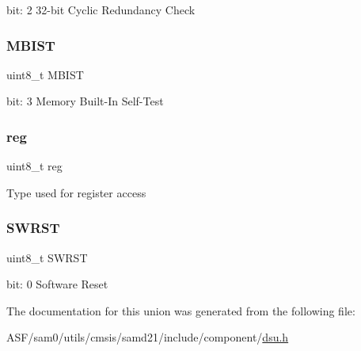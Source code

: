 bit\+: 2 32-\/bit Cyclic Redundancy Check \mbox{\label{union_d_s_u___c_t_r_l___type_aab65dd9b182f6be2254611db5d495217}} 
\subsubsection{\texorpdfstring{MBIST}{MBIST}}
{\footnotesize\ttfamily uint8\+\_\+t M\+B\+I\+ST}

bit\+: 3 Memory Built-\/\+In Self-\/\+Test \mbox{\label{union_d_s_u___c_t_r_l___type_a9428adc9af4653a2050e2536b55dec8d}} 
\subsubsection{\texorpdfstring{reg}{reg}}
{\footnotesize\ttfamily uint8\+\_\+t reg}

Type used for register access \mbox{\label{union_d_s_u___c_t_r_l___type_a9334d5ac0548802c90a8129c52c8e490}} 
\subsubsection{\texorpdfstring{SWRST}{SWRST}}
{\footnotesize\ttfamily uint8\+\_\+t S\+W\+R\+ST}

bit\+: 0 Software Reset 

The documentation for this union was generated from the following file\+:\begin{DoxyCompactItemize}
\item 
A\+S\+F/sam0/utils/cmsis/samd21/include/component/\mbox{\hyperlink{component_2dsu_8h}{dsu.\+h}}\end{DoxyCompactItemize}
